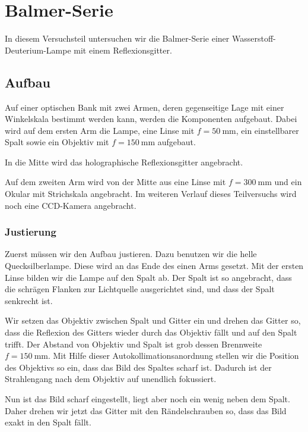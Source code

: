 \FloatBarrier
\section{Balmer-Serie}

In diesem Versuchsteil untersuchen wir die Balmer-Serie einer
Wasserstoff-Deuterium-Lampe mit einem Reflexionsgitter.

\FloatBarrier
\subsection{Aufbau}

Auf einer optischen Bank mit zwei Armen, deren gegenseitige Lage mit einer
Winkelskala bestimmt werden kann, werden die Komponenten aufgebaut. Dabei wird
auf dem ersten Arm die Lampe, eine Linse mit $f = \SI{50}{\milli\meter}$, ein
einstellbarer Spalt sowie ein Objektiv mit $f = \SI{150}{\milli\meter}$
aufgebaut.

In die Mitte wird das holographische Reflexionsgitter angebracht.

Auf dem zweiten Arm wird von der Mitte aus eine Linse mit $f =
\SI{300}{\milli\meter}$ und ein Okular mit Strichskala angebracht. Im weiteren
Verlauf dieses Teilversuchs wird noch eine CCD-Kamera angebracht.

\FloatBarrier
\subsubsection{Justierung}

Zuerst müssen wir den Aufbau justieren. Dazu benutzen wir die helle
Quecksilberlampe. Diese wird an das Ende des einen Arms gesetzt. Mit der ersten
Linse bilden wir die Lampe auf den Spalt ab. Der Spalt ist so angebracht, dass
die schrägen Flanken zur Lichtquelle ausgerichtet sind, und dass der Spalt
senkrecht ist.

Wir setzen das Objektiv zwischen Spalt und Gitter ein und drehen das Gitter so,
dass die Reflexion des Gitters wieder durch das Objektiv fällt und auf den
Spalt trifft. Der Abstand von Objektiv und Spalt ist grob dessen Brennweite $f
= \SI{150}{\milli\meter}$. Mit Hilfe dieser Autokollimationsanordnung stellen
wir die Position des Objektivs so ein, dass das Bild des Spaltes scharf ist.
Dadurch ist der Strahlengang nach dem Objektiv auf unendlich fokussiert.

Nun ist das Bild scharf eingestellt, liegt aber noch ein wenig neben dem Spalt.
Daher drehen wir jetzt das Gitter mit den Rändelschrauben so, dass das Bild
exakt in den Spalt fällt.

